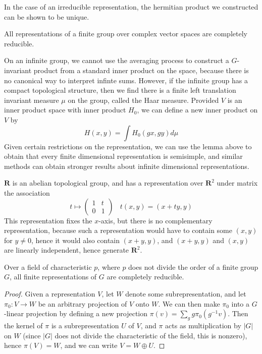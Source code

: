 In the case of an irreducible representation, the hermitian product we constructed can be shown to be unique.

\begin{corollary}
    All representations of a finite group over complex vector spaces are completely reducible.
\end{corollary}

On an infinite group, we cannot use the averaging process to construct a $G$-invariant product from a standard inner product on the space, because there is no canonical way to interpret infinte sums. However, if the infinite group has a compact topological structure, then we find there is a finite left translation invariant measure $\mu$ on the group, called the Haar measure. Provided $V$ is an inner product space with inner product $H_0$, we can define a new inner product on $V$ by
%
\[ H(x,y) = \int H_0(gx, gy) d\mu \]
%
Given certain restrictions on the representation, we can use the lemma above to obtain that every finite dimensional representation is semisimple, and similar methods can obtain stronger results about infinite dimensional representations.

\begin{example}
    $\mathbf{R}$ is an abelian topological group, and has a representation over $\mathbf{R}^2$ under matrix the association
    \[ t \mapsto \begin{pmatrix} 1 & t \\ 0 & 1 \end{pmatrix}\ \ \ \ t(x,y) = (x + ty,y) \]
    This representation fixes the $x$-axis, but there is no complementary representation, because such a representation would have to contain some $(x,y)$ for $y \neq 0$, hence it would also contain $(x + y, y)$, and $(x + y, y)$ and $(x,y)$ are linearly independent, hence generate $\mathbf{R}^2$.
\end{example}

\begin{theorem}
    Over a field of characteristic $p$, where $p$ does not divide the order of a finite group $G$, all finite representations of $G$ are completely reducible.
\end{theorem}
\begin{proof}
    Given a representation $V$, let $W$ denote some subrepresentation, and let $\pi_0: V \to W$ be an arbitrary projection of $V$ onto $W$. We can then make $\pi_0$ into a $G$-linear projection by defining a new projection $\pi(v) = \sum_g g \pi_0(g^{-1}v)$. Then the kernel of $\pi$ is a subrepresentation $U$ of $V$, and $\pi$ acts as multiplication by $|G|$ on $W$ (since $|G|$ does not divide the characteristic of the field, this is nonzero), hence $\pi(V) = W$, and we can write $V = W \oplus U$.
\end{proof}

